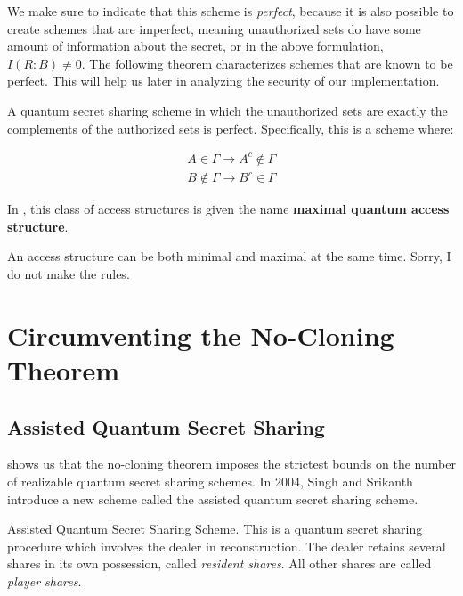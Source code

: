 We make sure to indicate that this scheme is \textit{perfect}, because it is also possible to create schemes that are imperfect, meaning unauthorized sets do have some amount of information about the secret, or in the above formulation, $I(R:B) \neq 0$. The following theorem characterizes schemes that are known to be perfect. This will help us later in analyzing the security of our implementation.

\begin{theorem}
    A quantum secret sharing scheme in which the unauthorized sets are exactly the complements of the authorized sets is perfect. Specifically, this is a scheme where:
    
    \begin{align}
        A \in \Gamma \to A^c \notin \Gamma \\ 
        B \notin \Gamma \to B^c \in \Gamma
    \end{align}
\end{theorem}

In \cite{gottesman_theory_2000}, this class of access structures is given the name \textbf{maximal quantum access structure}.

\begin{remark}
    An access structure can be both minimal and maximal at the same time. Sorry, I do not make the rules.
\end{remark}

\section{Circumventing the No-Cloning Theorem}

\subsection{Assisted Quantum Secret Sharing}
\label{ssec:aqss}

 shows us that the no-cloning theorem imposes the strictest bounds on the number of realizable quantum secret sharing schemes. In 2004, Singh and Srikanth introduce a new scheme called the assisted quantum secret sharing scheme. 

\begin{definition}{Assisted Quantum Secret Sharing Scheme.}
    \label{defn:aqss}
    This is a quantum secret sharing procedure which involves the dealer in reconstruction. The dealer retains several shares in its own possession, called \textit{resident shares}. All other shares are called \textit{player shares}.
\end{definition}

